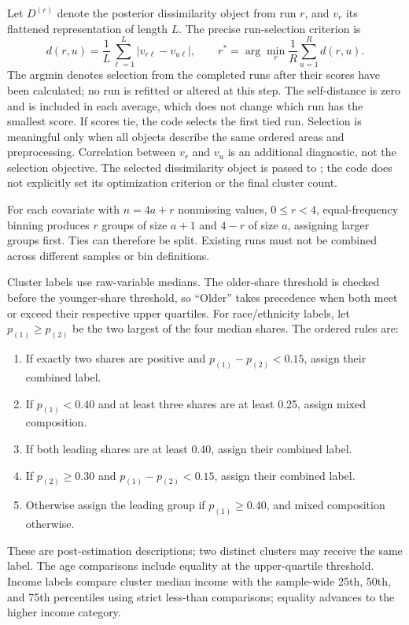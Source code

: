 \documentclass[11pt,letterpaper]{article}
\newcommand{\code}[1]{\texttt{\detokenize{#1}}}
\begin{document}
Let \(D^{(r)}\) denote the posterior dissimilarity object from run \(r\), and \(v_r\) its flattened representation of length \(L\). The precise run-selection criterion is
\begin{equation}
 d(r,u)=\frac{1}{L}\sum_{\ell=1}^{L}|v_{r\ell}-v_{u\ell}|,
 \qquad r^*=\arg\min_r\frac{1}{R}\sum_{u=1}^{R}d(r,u).
\end{equation}
The argmin denotes selection from the completed runs after their scores have been calculated; no run is refitted or altered at this step. The self-distance is zero and is included in each average, which does not change which run has the smallest score. If scores tie, the code selects the first tied run. Selection is meaningful only when all objects describe the same ordered areas and preprocessing. Correlation between \(v_r\) and \(v_u\) is an additional diagnostic, not the selection objective. The selected dissimilarity object is passed to \code{calcOptimalClustering}; the code does not explicitly set its optimization criterion or the final cluster count.

For each covariate with \(n=4a+r\) nonmissing values, \(0\le r<4\), equal-frequency binning produces \(r\) groups of size \(a+1\) and \(4-r\) of size \(a\), assigning larger groups first. Ties can therefore be split. Existing runs must not be combined across different samples or bin definitions.

Cluster labels use raw-variable medians. The older-share threshold is checked before the younger-share threshold, so ``Older'' takes precedence when both meet or exceed their respective upper quartiles. For race/ethnicity labels, let \(p_{(1)}\ge p_{(2)}\) be the two largest of the four median shares. The ordered rules are:
\begin{enumerate}
\item If exactly two shares are positive and \(p_{(1)}-p_{(2)}<0.15\), assign their combined label.
\item If \(p_{(1)}<0.40\) and at least three shares are at least 0.25, assign mixed composition.
\item If both leading shares are at least 0.40, assign their combined label.
\item If \(p_{(2)}\ge0.30\) and \(p_{(1)}-p_{(2)}<0.15\), assign their combined label.
\item Otherwise assign the leading group if \(p_{(1)}\ge0.40\), and mixed composition otherwise.
\end{enumerate}
These are post-estimation descriptions; two distinct clusters may receive the same label.
The age comparisons include equality at the upper-quartile threshold. Income labels compare cluster median income with the sample-wide 25th, 50th, and 75th percentiles using strict less-than comparisons; equality advances to the higher income category.
\end{document}
